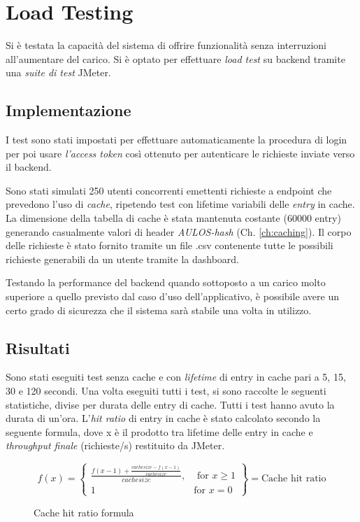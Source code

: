 \chapter{Load Testing}
\label{ch:stresstesting}
Si è testata la capacità del sistema di offrire funzionalità senza interruzioni all'aumentare del carico. 
Si è optato per effettuare\textit{ load test} su backend tramite una \textit{suite di test} JMeter. \cite{JMETER}

\section{Implementazione}

I test sono stati impostati per effettuare automaticamente la procedura di login per poi usare \textit{l'access token} così ottenuto per autenticare le richieste inviate verso il backend.

Sono stati simulati 250 utenti concorrenti emettenti richieste a endpoint che prevedono l'uso di \textit{cache}, ripetendo test con lifetime variabili delle \textit{entry} in cache.
La dimensione della tabella di cache è stata mantenuta costante (60000 entry) generando casualmente valori di header \textit{AULOS-hash} (Ch. \ref{ch:caching}).
Il corpo delle richieste è stato fornito tramite un file .csv contenente tutte le possibili richieste generabili da un utente tramite la dashboard.

Testando la performance del backend quando sottoposto a un carico molto superiore a quello previsto dal caso d'uso dell'applicativo, è possibile avere un certo grado di sicurezza che il sistema sarà stabile una volta in utilizzo.

\section{Risultati}
Sono stati eseguiti test senza cache e con \textit{lifetime} di entry in cache pari a 5, 15, 30 e 120 secondi. 
Una volta eseguiti tutti i test, si sono raccolte le seguenti statistiche, divise per durata delle entry di cache. Tutti i test hanno avuto la durata di un'ora.
L'\textit{hit ratio} di entry in cache è stato calcolato secondo la seguente formula, dove x è il prodotto tra lifetime delle entry in cache e \textit{throughput finale} (richieste/s) restituito da JMeter.
\begin{figure}[h!]

\begin{Large}
  \[
    f(x) = \left\{\begin{array}{lr}
        \frac{f(x-1)+\frac{cachesize - f(x-1)}{cachesize}}{cachesize}, & \text{ for } x\geq 1\\
        1 & \text{for } x=0
        \end{array}\right\} = \text{Cache hit ratio}
  \]
\caption{Cache hit ratio formula}
\label{fig:formula}
\end{Large}

\end{figure}
\FloatBarrier

